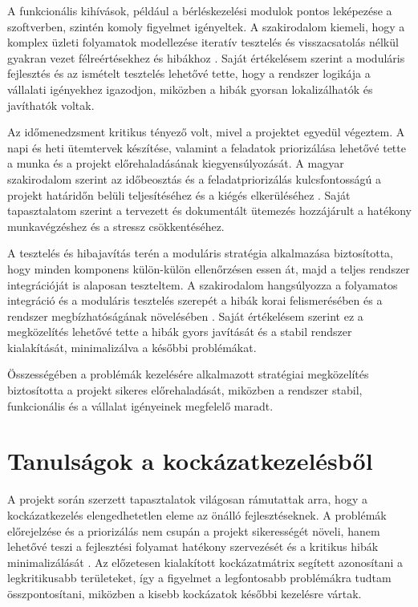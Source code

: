 A funkcionális kihívások, például a bérléskezelési modulok pontos leképezése a szoftverben, szintén komoly figyelmet igényeltek. 
A szakirodalom kiemeli, hogy a komplex üzleti folyamatok modellezése iteratív tesztelés és 
visszacsatolás nélkül gyakran vezet félreértésekhez és hibákhoz \cite{Szalay2018,Kaposi2019}. 
Saját értékelésem szerint a moduláris fejlesztés és az ismételt tesztelés lehetővé tette, hogy 
a rendszer logikája a vállalati igényekhez igazodjon, miközben a hibák gyorsan lokalizálhatók és javíthatók voltak.

Az időmenedzsment kritikus tényező volt, mivel a projektet egyedül végeztem. 
A napi és heti ütemtervek készítése, valamint a feladatok priorizálása lehetővé tette a munka és a projekt előrehaladásának kiegyensúlyozását. 
A magyar szakirodalom szerint az időbeosztás és a feladatpriorizálás kulcsfontosságú a 
projekt határidőn belüli teljesítéséhez és a kiégés elkerüléséhez \cite{Kovacs2016,Hajdu2014}. 
Saját tapasztalatom szerint a tervezett és dokumentált ütemezés hozzájárult a hatékony munkavégzéshez és a stressz csökkentéséhez.

A tesztelés és hibajavítás terén a moduláris stratégia alkalmazása biztosította, 
hogy minden komponens külön-külön ellenőrzésen essen át, majd a teljes rendszer integrációját is alaposan teszteltem. 
A szakirodalom hangsúlyozza a folyamatos integráció és a moduláris tesztelés szerepét 
a hibák korai felismerésében és a rendszer megbízhatóságának növelésében \cite{Szalay2018,Kaposi2019}. 
Saját értékelésem szerint ez a megközelítés lehetővé tette a hibák gyors javítását és a stabil rendszer kialakítását, minimalizálva a későbbi problémákat.

Összességében a problémák kezelésére alkalmazott stratégiai megközelítés biztosította a projekt sikeres előrehaladását, 
miközben a rendszer stabil, funkcionális és a vállalat igényeinek megfelelő maradt.


\section{Tanulságok a kockázatkezelésből}

A projekt során szerzett tapasztalatok világosan rámutattak arra, hogy a kockázatkezelés elengedhetetlen eleme az önálló fejlesztéseknek. 
A problémák előrejelzése és a priorizálás nem csupán a projekt sikerességét növeli, 
hanem lehetővé teszi a fejlesztési folyamat hatékony szervezését és a kritikus hibák minimalizálását \cite{Hajdu2014,Kovacs2016,Szalay2018}. 
Az előzetesen kialakított kockázatmátrix segített azonosítani a legkritikusabb területeket, 
így a figyelmet a legfontosabb problémákra tudtam összpontosítani, miközben a kisebb kockázatok későbbi kezelésre vártak.

